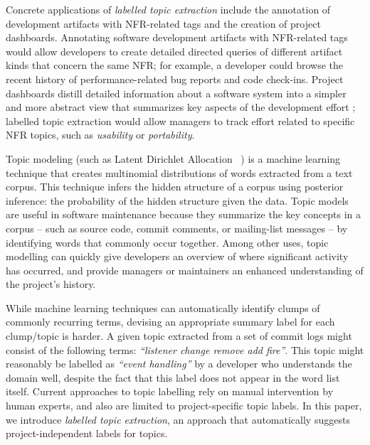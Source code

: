 \documentclass[smallextended]{svjour3}       %
\begin{document}
Concrete applications of \emph{labelled topic extraction} include the annotation of development artifacts with NFR-related tags and the creation of project dashboards.  Annotating software development artifacts with NFR-related tags would allow developers to create detailed directed queries of different artifact kinds that concern the same NFR; for example, a developer could browse the recent history of performance-related bug reports and code check-ins. Project dashboards distill detailed information about a software system into a simpler and more abstract view that summarizes key aspects of the development effort \cite{dashboard}; labelled topic extraction would allow managers to track effort related to specific NFR topics, such as \emph{usability} or \emph{portability}.


Topic modeling (such as Latent Dirichlet Allocation ~\cite{Blei2003}) is a machine learning technique that creates
multinomial distributions of words extracted from a text corpus. 
This technique infers the hidden structure of a corpus using posterior
inference: the probability of the hidden structure given the data. 
Topic models are useful in software maintenance because they summarize
the key concepts in a corpus -- such as source code, commit comments, or
mailing-list messages -- by identifying words that commonly occur together. 
Among other uses, topic modelling can quickly give developers an overview of where significant
activity has occurred, and provide managers or maintainers an enhanced understanding of the project's 
history.

While machine learning techniques can automatically identify clumps of
commonly recurring terms, devising an appropriate summary label for
each clump/topic is harder.  
A given topic extracted from a set of commit logs might consist of the following terms: \emph{ ``listener change remove add fire''}. 
This topic might reasonably be labelled as
\emph{``event handling''} by a developer who understands the domain well,
despite the fact that this label does not appear in the word list itself.  
Current approaches to topic labelling rely on manual intervention by
human experts, and also are limited to project-specific topic labels.  
In this paper, we introduce \emph{labelled topic extraction}, an
approach that automatically suggests project-independent labels for topics.
\end{document}
